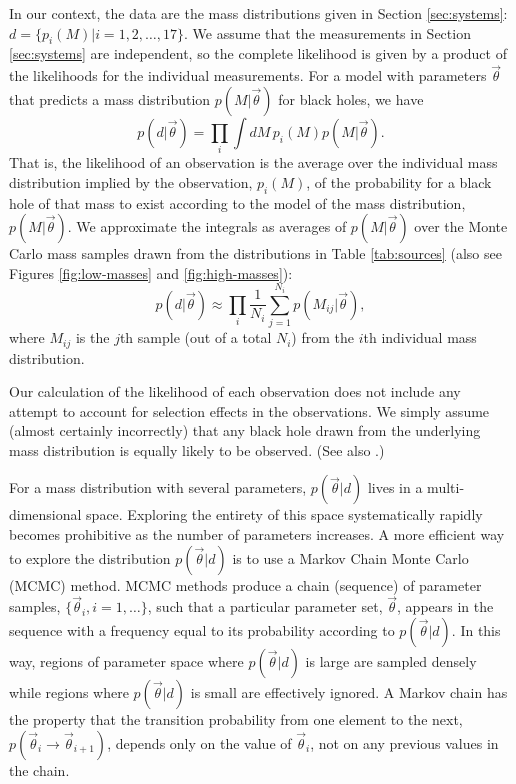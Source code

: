 \documentclass[preprint]{aastex}
\newcommand{\vtheta}{\vec{\theta}}
\begin{document}
In our context, the data are the mass distributions given in Section
\ref{sec:systems}: $d = \{ p_i(M)| i = 1, 2, \ldots, 17 \}$.  We
assume that the measurements in Section \ref{sec:systems} are
independent, so the complete likelihood is given by a product of the
likelihoods for the individual measurements.  For a model with
parameters $\vtheta$ that predicts a mass distribution $p(M|\vtheta)$
for black holes, we have
\begin{equation}
  \label{eq:likelihood-def}
  p(d|\vtheta) = \prod_i \int dM\, p_i(M) p(M|\vtheta).
\end{equation}
That is, the likelihood of an observation is the average over the
individual mass distribution implied by the observation, $p_i(M)$, of
the probability for a black hole of that mass to exist according to
the model of the mass distribution, $p(M | \vtheta)$.  We approximate
the integrals as averages of $p(M|\vtheta)$ over the Monte Carlo mass
samples drawn from the distributions in Table \ref{tab:sources} (also
see Figures \ref{fig:low-masses} and \ref{fig:high-masses}):
\begin{equation}
  p(d|\vtheta) \approx \prod_i \frac{1}{N_i} \sum_{j = 1}^{N_i} p(M_{ij} | \vtheta),
\end{equation}
where $M_{ij}$ is the $j$th sample (out of a total $N_i$) from the
$i$th individual mass distribution.

Our calculation of the likelihood of each observation does not include
any attempt to account for selection effects in the observations.  We
simply assume (almost certainly incorrectly) that any black hole drawn
from the underlying mass distribution is equally likely to be
observed.  (See also \citet{Ozel2010}.)

For a mass distribution with several parameters, $p(\vtheta | d)$
lives in a multi-dimensional space.  Exploring the entirety of this
space systematically rapidly becomes prohibitive as the number of
parameters increases.  A more efficient way to explore the
distribution $p(\vtheta | d)$ is to use a Markov Chain Monte Carlo
(MCMC) method.  MCMC methods produce a chain (sequence) of parameter
samples, $\{ \vtheta_i, i = 1, \ldots \}$, such that a particular
parameter set, $\vtheta$, appears in the sequence with a frequency
equal to its probability according to $p(\vtheta|d)$.  In this way,
regions of parameter space where $p(\vtheta|d)$ is large are sampled
densely while regions where $p(\vtheta|d)$ is small are effectively
ignored.  A Markov chain has the property that the transition
probability from one element to the next, $p(\vtheta_i \to
\vtheta_{i+1})$, depends only on the value of $\vtheta_i$, not on any
previous values in the chain.
\end{document}
